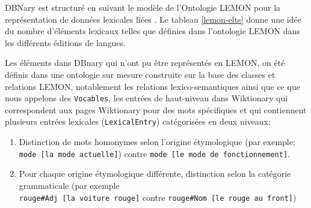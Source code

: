 \documentclass[10pt,a4paper,twoside]{article}
\begin{document}
DBNary est structuré en suivant le modèle de l'Ontologie LEMON pour la représentation de données lexicales liées \cite{DBLP:conf/esws/McCraeSC11}. Le tableau \ref{lemon-elts} donne une idée du nombre d'éléments lexicaux telles que définies dans l'ontologie LEMON dans les différents éditions de langues.

Les éléments dans DBnary qui n'ont pu être représentés en LEMON, on été définis dans une ontologie sur mesure construite sur la base des classes et relations LEMON, notablement les relations lexico-semantiques ainsi que ce que nous appelons des \verb|Vocables|, les entrées de haut-niveau dans Wiktionary qui correspondent aux pages Wiktionary pour des mots spécifiques et qui contiennent plusieurs entrées lexicales (\verb|LexicalEntry|) catégorisées en deux niveaux:
\begin{enumerate}
	\item Distinction de mots homonymes selon l'origine étymologique (par exemple: \verb|mode [la mode actuelle]|) contre \verb|mode [le mode de fonctionnement]|.
	\item Pour chaque origine étymologique différente, distinction selon la catégorie grammaticale (par exemple \\ \verb|rouge#Adj [la voiture rouge]| contre \verb|rouge#Nom [le rouge au front]|)
\end{enumerate}
\end{document}
